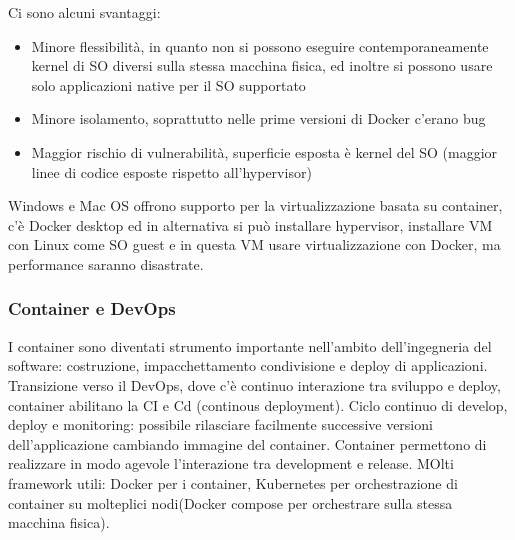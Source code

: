 \documentclass[16px]{article}
\begin{document}
Ci sono alcuni svantaggi:
\begin{itemize}
\item Minore flessibilità, in quanto non si possono eseguire contemporaneamente kernel di SO diversi sulla stessa macchina fisica, ed inoltre si possono usare solo applicazioni native per il SO supportato
\item Minore isolamento, soprattutto nelle prime versioni di Docker c'erano bug 
\item Maggior rischio di vulnerabilità, superficie esposta è kernel del SO (maggior linee di codice esposte rispetto all'hypervisor)
\end{itemize}
Windows e Mac OS offrono supporto per la virtualizzazione basata su container, c'è Docker desktop ed in alternativa si può installare hypervisor, installare VM con Linux come SO guest e in questa VM usare virtualizzazione con Docker, ma performance saranno disastrate.
\subsubsection{Container e DevOps}
I container sono diventati strumento importante nell'ambito dell'ingegneria del software: costruzione, impacchettamento condivisione e deploy di applicazioni. Transizione verso il DevOps, dove c'è continuo interazione tra sviluppo e deploy, container abilitano la CI e Cd (continous deployment). Ciclo continuo di develop, deploy e monitoring: possibile rilasciare facilmente successive versioni dell'applicazione cambiando immagine del container. Container permettono di realizzare in modo agevole l'interazione tra development e release. MOlti framework utili: Docker per i container, Kubernetes per orchestrazione di container su molteplici nodi(Docker compose per orchestrare sulla stessa macchina fisica).
\end{document}
